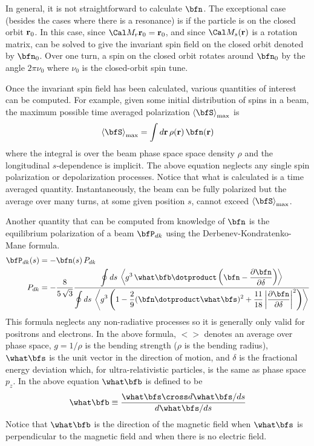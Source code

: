 {In general, it is not straightforward to calculate $\bfn$. The exceptional case (besides the cases
where there is a resonance) is if the particle is on the closed orbit ${\bf r}_0$. In this case, since
$\Cal M_r \bfr_0 = \bfr_0$, and since $\Cal M_s(\bfr)$ is a rotation matrix,  can be solved
to give the invariant spin field on the closed orbit denoted by $\bfn_0$.  Over one turn, a spin on
the closed orbit rotates around $\bfn_0$ by the angle $2 \pi \nu_0$ where $\nu_0$ is the
closed-orbit spin tune.

Once the invariant spin field has been calculated, various quantities of interest can be
computed. For example, given some initial distribution of spins in a beam, the maximum possible time
averaged polarization $\left< \bfS \right>_{\max}$ is
\begin{equation}
  \left< \bfS \right>_{\max} = \int d\bfr \, \rho(\bfr) \, \bfn(\bfr)
\end{equation}
where the integral is over the beam phase space space density $\rho$ and the longitudinal
$s$-dependence is implicit. The above equation neglects any single spin polarization or
depolarization processes. Notice that what is calculated is a time averaged quantity.
Instantaneously, the beam can be fully polarized but the average over many turns, at some given
position $s$, cannot exceed $\left< \bfS \right>_{\max}$.

Another quantity that can be computed from knowledge of $\bfn$ is the equilibrium polarization of a beam
$\bfP_{dk}$ using the Derbenev-Kondratenko-Mane formula\cite{b:barber99}.
\begin{align}
  \bfP_{dk}(s) &= -\bfn(s) \, P_{dk} \\
  P_{dk} &= -\frac{8}{5 \, \sqrt{3}}
  \frac{\displaystyle \oint ds \,\left< g^3 \, \what\bfb \dotproduct 
    \left( \bfn - \frac{\partial \bfn}{\partial \delta} \right) \right>}
  {\displaystyle \oint ds \, \left< g^3 \left( 1 - \frac{2}{9} (\bfn \dotproduct \what\bfs)^2 + 
    \frac{11}{18} \left| \frac{\partial \bfn}{\partial \delta} \right|^2 \right) \right>}
    \nonumber
\end{align}
This formula neglects any non-radiative processes so it is generally only valid for positrons and
electrons.  In the above formula, $<>$ denotes an average over phase space, $g = 1/\rho$ is the
bending strength ($\rho$ is the bending radius), $\what\bfs$ is the unit vector in the direction of
motion, and $\delta$ is the fractional energy deviation which, for ultra-relativistic particles, is
the same as phase space $p_z$. In the above equation $\what\bfb$ is defined to be
\begin{equation}
  \what\bfb \equiv \frac{\what\bfs \cross d\what\bfs/ds}{d\what\bfs/ds}
\end{equation}
Notice that $\what\bfb$ is the direction of the magnetic field when $\what\bfs$ is perpendicular to
the magnetic field and when there is no electric field.

}
